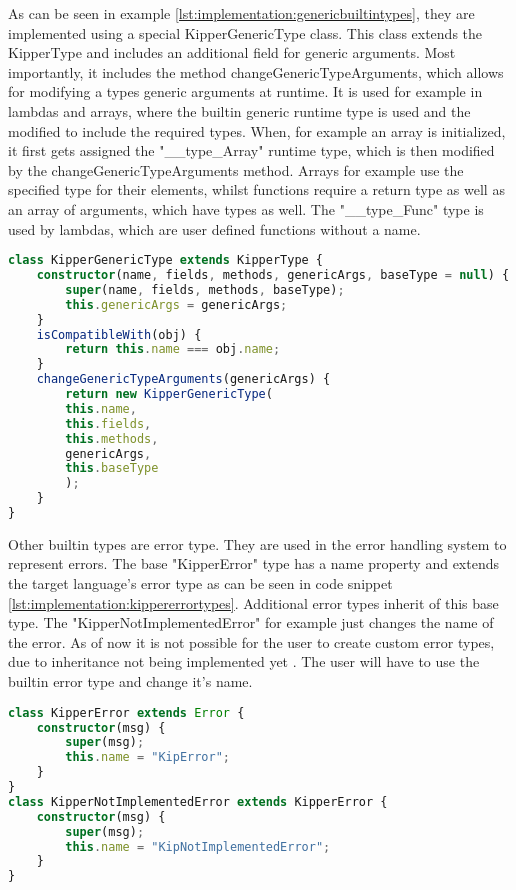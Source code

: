 As can be seen in example \ref{lst:implementation:genericbuiltintypes}, they are implemented using a special KipperGenericType class. This class extends the KipperType and includes an additional field for generic arguments. Most importantly, it includes the method changeGenericTypeArguments, which allows for modifying a types generic arguments at runtime. It is used for example in lambdas and arrays, where the builtin generic runtime type is used and the modified to include the required types. When, for example an array is initialized, it first gets assigned the "\_\_type\_Array" runtime type, which is then modified by the changeGenericTypeArguments method. Arrays for example use the specified type for their elements, whilst functions require a return type as well as an array of arguments, which have types as well. The "\_\_type\_Func" type is used by lambdas, which are user defined functions without a name.

\begin{lstlisting}[language=Typescript,caption=Generic Kipper Type,label=lst:implementation:generickippertype]
class KipperGenericType extends KipperType {
	constructor(name, fields, methods, genericArgs, baseType = null) {
		super(name, fields, methods, baseType);
		this.genericArgs = genericArgs;
	}
	isCompatibleWith(obj) {
		return this.name === obj.name;
	}
	changeGenericTypeArguments(genericArgs) {
		return new KipperGenericType(
		this.name,
		this.fields,
		this.methods,
		genericArgs,
		this.baseType
		);
	}
}
\end{lstlisting}

Other builtin types are error type. They are used in the error handling system to represent errors. The base "KipperError" type has a name property and extends the target language's error type as can be seen in code snippet \ref{lst:implementation:kippererrortypes}. Additional error types inherit of this base type. The "KipperNotImplementedError" for example just changes the name of the error. As of now it is not possible for the user to create custom error types, due to inheritance not being implemented yet . The user will have to use the builtin error type and change it's name.

\begin{lstlisting}[language=Typescript,caption=Kipper error types,label=lst:implementation:kippererrortypes]
class KipperError extends Error {
	constructor(msg) {
		super(msg);
		this.name = "KipError";
	}
}
class KipperNotImplementedError extends KipperError {
	constructor(msg) {
		super(msg);
		this.name = "KipNotImplementedError";
	}
}
\end{lstlisting}

